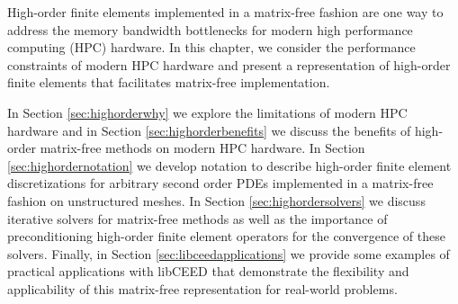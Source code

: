 High-order finite elements implemented in a matrix-free fashion are one way to address the memory bandwidth bottlenecks for modern high performance computing (HPC) hardware.
In this chapter, we consider the performance constraints of modern HPC hardware and present a representation of high-order finite elements that facilitates matrix-free implementation.

In Section \ref{sec:highorderwhy} we explore the limitations of modern HPC hardware and in Section \ref{sec:highorderbenefits} we discuss the benefits of high-order matrix-free methods on modern HPC hardware.
In Section \ref{sec:highordernotation} we develop notation to describe high-order finite element discretizations for arbitrary second order PDEs implemented in a matrix-free fashion on unstructured meshes.
In Section \ref{sec:highordersolvers} we discuss iterative solvers for matrix-free methods as well as the importance of preconditioning high-order finite element operators for the convergence of these solvers.
Finally, in Section \ref{sec:libceedapplications} we provide some examples of practical applications with libCEED that demonstrate the flexibility and applicability of this matrix-free representation for real-world problems.

